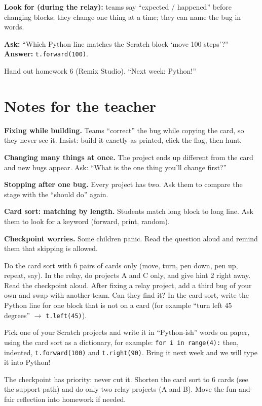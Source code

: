 \begin{formativecheck}
\textbf{Look for (during the relay):} teams say \enquote{expected / happened} before changing blocks; they change one thing at a time; they can name the bug in words.

\textbf{Ask:} \enquote{Which Python line matches the Scratch block \enquote{move 100 steps}?}
\textbf{Answer:} \texttt{t.forward(100)}.
\end{formativecheck}

Hand out homework 6 (Remix Studio). \enquote{Next week: Python!}

\section{Notes for the teacher}
\begin{commonmistakes}
  \item \textbf{Fixing while building.} Teams \enquote{correct} the bug while copying the card, so they never see it. Insist: build it exactly as printed, click the flag, then hunt.
  \item \textbf{Changing many things at once.} The project ends up different from the card and new bugs appear. Ask: \enquote{What is the one thing you'll change first?}
  \item \textbf{Stopping after one bug.} Every project has two. Ask them to compare the stage with the \enquote{should do} again.
  \item \textbf{Card sort: matching by length.} Students match long block to long line. Ask them to look for a keyword (forward, print, random).
  \item \textbf{Checkpoint worries.} Some children panic. Read the question aloud and remind them that skipping is allowed.
\end{commonmistakes}

\begin{differentiation}
\supportpath Do the card sort with 6 pairs of cards only (move, turn, pen down, pen up, repeat, say). In the relay, do projects A and C only, and give hint 2 right away. Read the checkpoint aloud.
\extensionpath After fixing a relay project, add a third bug of your own and swap with another team. Can they find it? In the card sort, write the Python line for one block that is not on a card (for example \enquote{turn left 45 degrees} $\rightarrow$ \texttt{t.left(45)}).
\end{differentiation}

\begin{stretchchallenge}
Pick one of your Scratch projects and write it in \enquote{Python-ish} words on paper, using the card sort as a dictionary, for example: \texttt{for i in range(4):} then, indented, \texttt{t.forward(100)} and \texttt{t.right(90)}. Bring it next week and we will type it into Python!
\end{stretchchallenge}

\begin{teachernote}
The checkpoint has priority: never cut it. Shorten the card sort to 6 cards (see the support path) and do only two relay projects (A and B). Move the fun-and-fair reflection into homework if needed.
\end{teachernote}
